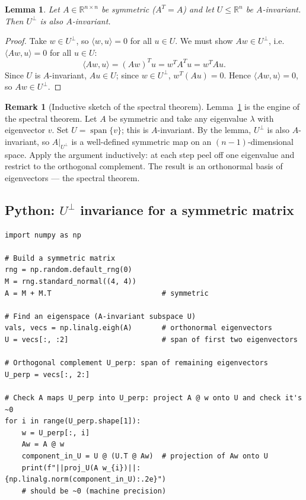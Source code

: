 \documentclass[11pt]{article}
\theoremstyle{definition}
\newtheorem{remark}{Remark}[section]
\theoremstyle{plain}
\newtheorem{lemma}{Lemma}[section]
\begin{document}
\begin{lemma}\label{lem:perp-invariant}
  Let $A \in \mathbb{R}^{n\times n}$ be symmetric ($A^T = A$) and let
  $U \le \mathbb{R}^n$ be $A$-invariant.  Then $U^\perp$ is also $A$-invariant.
\end{lemma}
\begin{proof}
  Take $w \in U^\perp$, so $\langle w, u\rangle = 0$ for all $u \in U$.
  We must show $Aw \in U^\perp$, i.e.\ $\langle Aw, u\rangle = 0$ for all
  $u \in U$:
  \[
    \langle Aw, u\rangle = (Aw)^T u = w^T A^T u = w^T A u.
  \]
  Since $U$ is $A$-invariant, $Au \in U$; since $w \in U^\perp$,
  $w^T(Au) = 0$.  Hence $\langle Aw, u\rangle = 0$, so $Aw \in U^\perp$.
\end{proof}

\begin{remark}[Inductive sketch of the spectral theorem]
  Lemma~\ref{lem:perp-invariant} is the engine of the spectral theorem.
  Let $A$ be symmetric and take any eigenvalue $\lambda$ with eigenvector $v$.
  Set $U = \operatorname{span}\{v\}$; this is $A$-invariant.  By the lemma,
  $U^\perp$ is also $A$-invariant, so $A\big|_{U^\perp}$ is a well-defined
  symmetric map on an $(n-1)$-dimensional space.  Apply the argument
  inductively: at each step peel off one eigenvalue and restrict to the
  orthogonal complement.  The result is an orthonormal basis of eigenvectors ---
  the spectral theorem.
\end{remark}

\subsection{Python: $U^\perp$ invariance for a symmetric matrix}
\begin{lstlisting}
import numpy as np

# Build a symmetric matrix
rng = np.random.default_rng(0)
M = rng.standard_normal((4, 4))
A = M + M.T                          # symmetric

# Find an eigenspace (A-invariant subspace U)
vals, vecs = np.linalg.eigh(A)       # orthonormal eigenvectors
U = vecs[:, :2]                      # span of first two eigenvectors

# Orthogonal complement U_perp: span of remaining eigenvectors
U_perp = vecs[:, 2:]

# Check A maps U_perp into U_perp: project A @ w onto U and check it's ~0
for i in range(U_perp.shape[1]):
    w = U_perp[:, i]
    Aw = A @ w
    component_in_U = U @ (U.T @ Aw)  # projection of Aw onto U
    print(f"||proj_U(A w_{i})||: {np.linalg.norm(component_in_U):.2e}")
    # should be ~0 (machine precision)
\end{lstlisting}
\end{document}
